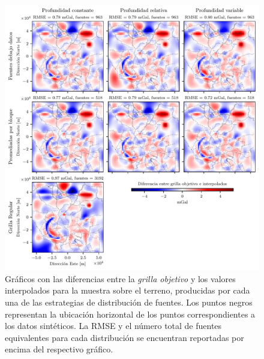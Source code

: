 \begin{figure}[p]
    \includegraphics[width=\linewidth]{figs/eql-gradient-boosted/ground_survey_differences.pdf}
    \caption{
        Gráficos con las diferencias entre la \emph{grilla objetivo} y los
        valores interpolados para la muestra sobre el terreno, producidas por
        cada una de las estrategias de distribución de fuentes.
        Los puntos negros representan la ubicación horizontal de los puntos
        correspondientes a los datos sintéticos.
        La \acs{RMSE} y el número total de fuentes equivalentes para cada
        distribución se encuentran reportadas por encima del respectivo
        gráfico.
    }
    \label{fig:ground-survey-differences}
\end{figure}

